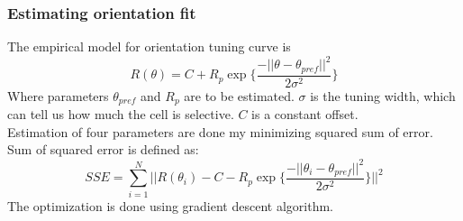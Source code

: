 \documentclass[11pt]{article}
\begin{document}
\subsubsection{Estimating orientation fit} %
\label{ssub:estimating_orientation_fit}
The empirical model for orientation tuning curve is
$$R(\theta) = C + R_p \exp\{\frac{-||\theta-\theta_{pref}||^2}{2\sigma^2}\}$$
Where parameters $\theta_{pref}$ and $R_p$ are to be estimated. $\sigma$ is the tuning width, which can tell us how much the cell is selective. $C$ is a constant offset.\\
Estimation of four parameters are done my minimizing squared sum of error. Sum of squared error is defined as:
$$SSE = \sum_{i=1}^N ||R(\theta_i) - C - R_p \exp\{\frac{-||\theta_i-\theta_{pref}||^2}{2\sigma^2}\}||^2$$
The optimization is done using gradient descent algorithm.\\

\end{document}
